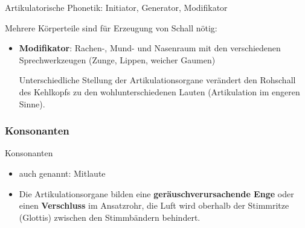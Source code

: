 \begin{frame}{Artikulatorische Phonetik: Initiator, Generator, Modifikator}

Mehrere Körperteile sind für Erzeugung von Schall nötig:

	\begin{itemize}
		\item \textbf{Modifikator}: Rachen-, Mund- und Nasenraum mit den verschiedenen Sprechwerkzeugen (Zunge, Lippen, weicher Gaumen) \ras
		
		Unterschiedliche Stellung der Artikulationsorgane verändert den Rohschall des Kehlkopfs zu den wohlunterschiedenen Lauten (Artikulation im engeren Sinne).
	\end{itemize}
	
\end{frame}


\subsubsection{Konsonanten}
\begin{frame}{Konsonanten}

	\begin{itemize}
		\item auch genannt: Mitlaute
		
		\item Die Artikulationsorgane bilden eine \textbf{geräuschverursachende Enge} oder einen \textbf{Verschluss} im Ansatzrohr, \dash die Luft wird oberhalb der Stimmritze (Glottis) zwischen den Stimmbändern behindert.
	\end{itemize}
	
\end{frame}


